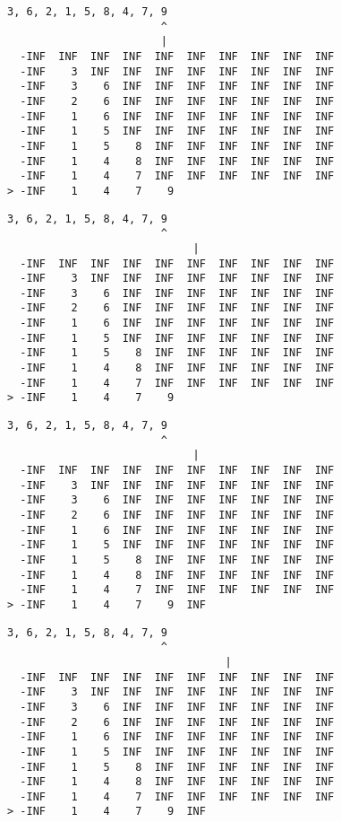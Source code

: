 { \begin{verbatim}
3, 6, 2, 1, 5, 8, 4, 7, 9
                        ^
                        |
  -INF  INF  INF  INF  INF  INF  INF  INF  INF  INF
  -INF    3  INF  INF  INF  INF  INF  INF  INF  INF
  -INF    3    6  INF  INF  INF  INF  INF  INF  INF
  -INF    2    6  INF  INF  INF  INF  INF  INF  INF
  -INF    1    6  INF  INF  INF  INF  INF  INF  INF
  -INF    1    5  INF  INF  INF  INF  INF  INF  INF
  -INF    1    5    8  INF  INF  INF  INF  INF  INF
  -INF    1    4    8  INF  INF  INF  INF  INF  INF
  -INF    1    4    7  INF  INF  INF  INF  INF  INF
> -INF    1    4    7    9                         
\end{verbatim} }

{ \begin{verbatim}
3, 6, 2, 1, 5, 8, 4, 7, 9
                        ^
                             |
  -INF  INF  INF  INF  INF  INF  INF  INF  INF  INF
  -INF    3  INF  INF  INF  INF  INF  INF  INF  INF
  -INF    3    6  INF  INF  INF  INF  INF  INF  INF
  -INF    2    6  INF  INF  INF  INF  INF  INF  INF
  -INF    1    6  INF  INF  INF  INF  INF  INF  INF
  -INF    1    5  INF  INF  INF  INF  INF  INF  INF
  -INF    1    5    8  INF  INF  INF  INF  INF  INF
  -INF    1    4    8  INF  INF  INF  INF  INF  INF
  -INF    1    4    7  INF  INF  INF  INF  INF  INF
> -INF    1    4    7    9                         
\end{verbatim} }

{ \begin{verbatim}
3, 6, 2, 1, 5, 8, 4, 7, 9
                        ^
                             |
  -INF  INF  INF  INF  INF  INF  INF  INF  INF  INF
  -INF    3  INF  INF  INF  INF  INF  INF  INF  INF
  -INF    3    6  INF  INF  INF  INF  INF  INF  INF
  -INF    2    6  INF  INF  INF  INF  INF  INF  INF
  -INF    1    6  INF  INF  INF  INF  INF  INF  INF
  -INF    1    5  INF  INF  INF  INF  INF  INF  INF
  -INF    1    5    8  INF  INF  INF  INF  INF  INF
  -INF    1    4    8  INF  INF  INF  INF  INF  INF
  -INF    1    4    7  INF  INF  INF  INF  INF  INF
> -INF    1    4    7    9  INF                    
\end{verbatim} }

{ \begin{verbatim}
3, 6, 2, 1, 5, 8, 4, 7, 9
                        ^
                                  |
  -INF  INF  INF  INF  INF  INF  INF  INF  INF  INF
  -INF    3  INF  INF  INF  INF  INF  INF  INF  INF
  -INF    3    6  INF  INF  INF  INF  INF  INF  INF
  -INF    2    6  INF  INF  INF  INF  INF  INF  INF
  -INF    1    6  INF  INF  INF  INF  INF  INF  INF
  -INF    1    5  INF  INF  INF  INF  INF  INF  INF
  -INF    1    5    8  INF  INF  INF  INF  INF  INF
  -INF    1    4    8  INF  INF  INF  INF  INF  INF
  -INF    1    4    7  INF  INF  INF  INF  INF  INF
> -INF    1    4    7    9  INF                    
\end{verbatim} }

